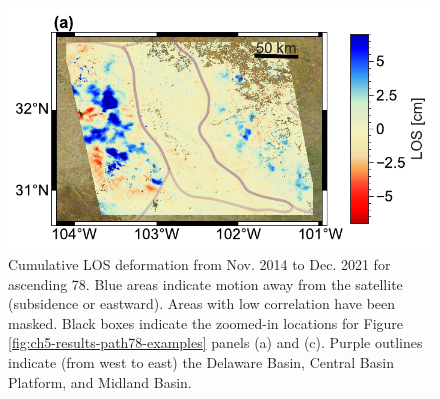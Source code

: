 \begin{figure}[h]
	\centering
	\includegraphics[width=.99\textwidth]{figures/chapter5-lowess/figure-results-los-path78.pdf}
	\caption[Cumulative 7-year LOS deformation for three Sentinel-1 paths]{
		Cumulative LOS deformation from Nov. 2014 to Dec. 2021 for ascending 78. Blue areas indicate motion away from the satellite (subsidence or eastward). Areas with low correlation have been masked.
		Black boxes indicate the zoomed-in locations for Figure \ref{fig:ch5-results-path78-examples} panels (a) and (c).
		Purple outlines indicate (from west to east) the Delaware Basin, Central Basin Platform, and Midland Basin.
	}
	\label{fig:ch5-results-path78}
\end{figure}



